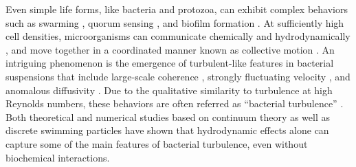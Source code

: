 \documentclass[aps,prl,floatfix,footinbib,twocolumn,superscriptaddress]{revtex4-1}
\begin{document}

Even simple life forms, like bacteria and protozoa, can exhibit complex behaviors such as swarming \cite{Kearns_NRM_2010,Ariel_NC_2015}, quorum sensing \cite{Waters_QuorumSensing_2005,Daniels_Quorum_PNAS_2006}, and biofilm formation \cite{Costerton_Science_1999,Hall_Stoodley_NRM_2004,desai_biofilms_2020}. At sufficiently high cell densities, microorganisms can communicate chemically \cite{Berg_Nature_1995,Kalinin_BioJ_2009} and hydrodynamically \cite{Sokolov_PRL_2007,Sokolov_PRL_2012}, and move together in a coordinated manner known as collective motion \cite{Koch_ARFM_2011}. An intriguing phenomenon is the emergence of turbulent-like features in bacterial suspensions that include large-scale coherence \cite{Dombrowski_PRL_2004,Sokolov_PRL_2007,Gachelin_NJP_2014}, strongly fluctuating velocity \cite{Guasto_PRL_2010, Rushkin_PRL_2010}, and anomalous diffusivity \cite{Ariel_NC_2015,Mukherjee_PRL_2021}. Due to the qualitative similarity to turbulence at high Reynolds numbers, these behaviors are often referred as ``bacterial turbulence'' \cite{Dombrowski_PRL_2004,Sokolov_PRL_2007,Koch_ARFM_2011,Sokolov_PRL_2012,Sokolov_PRE_2009,Cisneros_PRE_2011,Wensink_PNAS_2012,Dunkel_PRL_2013,Gachelin_NJP_2014}. Both theoretical and numerical studies based on continuum theory \cite{Dunkel_PRL_2013,Wensink_PNAS_2012,Saintillan_PRL_2008,Subramanian_JFM_2009,Hohenegger_PRE_2010,Saintillan_CRP_2013,Saintillan_SM_2017,Saintillan_JCP_2019} as well as discrete swimming particles \cite{Graham_PRL_2005,Saintillan_PRL_2007,Underhill_PRL_2008,Wolgemuth_BioJ_2008,Graham_JPCM_2009,Leoni_PRL_2010,Lushi_PNAS_2014,Krishnamurthy_JFM_2015,Morozov_PRL_2017,Morozov_SM_2019} have shown that hydrodynamic effects alone can capture some of the main features of bacterial turbulence, even without biochemical interactions.
\end{document}
